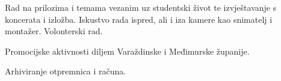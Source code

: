 \documentclass[10pt,a4paper]{altacv}
\begin{document}
\divider

\item Rad na prilozima i temama vezanim uz studentski život te izvještavanje s koncerata i izložba.
Iskustvo rada ispred, ali i iza kamere kao snimatelj i montažer. Volonterski rad. 

\divider

\item Promocijske aktivnosti diljem Varaždinske i Međimurske županije.

\divider

\item Arhiviranje otpremnica i računa.


\divider

\end{document}
